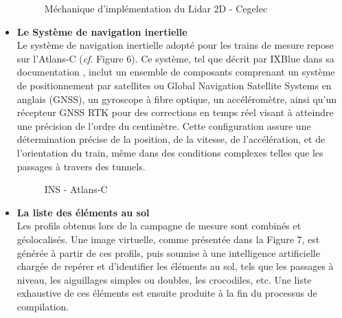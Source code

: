 \begin{itemize}
    \begin{figure}[H]
            \centering
            \caption{Méchanique d'implémentation du Lidar 2D - Cegelec \cite{RHEA}} 
        \end{figure}
    
    
    \item \textbf{Le Système de navigation inertielle} \\
    
    Le système de navigation inertielle adopté pour les trains de mesure repose sur l'Atlans-C (\textit{cf}. Figure 6). Ce système, tel que décrit par IXBlue dans sa documentation \cite{Atlans-c}, inclut un ensemble de composants comprenant un système de positionnement par satellites ou Global Navigation Satellite Systems en anglais (\gls{GNSS}), un gyroscope à fibre optique, un accéléromètre, ainsi qu'un récepteur GNSS \gls{RTK} pour des corrections en temps réel visant à atteindre une précision de l'ordre du centimètre. Cette configuration assure une détermination précise de la position, de la vitesse, de l'accélération, et de l'orientation du train, même dans des conditions complexes telles que les passages à travers des tunnels.

    \begin{figure}[H]
            \centering
            \caption{INS - Atlans-C \cite{Atlans-c}} 
        \end{figure}

    
    \item \textbf{La liste des éléments au sol}  \\
    
   Les profils obtenus lors de la campagne de mesure sont combinés et géolocalisés. Une image virtuelle, comme présentée dans la Figure 7, est générée à partir de ces profils, puis soumise à une intelligence artificielle chargée de repérer et d'identifier les éléments au sol, tels que les passages à niveau, les aiguillages simples ou doubles, les crocodiles, etc. Une liste exhaustive de ces éléments est ensuite produite à la fin du processus de compilation. 


\end{itemize}
